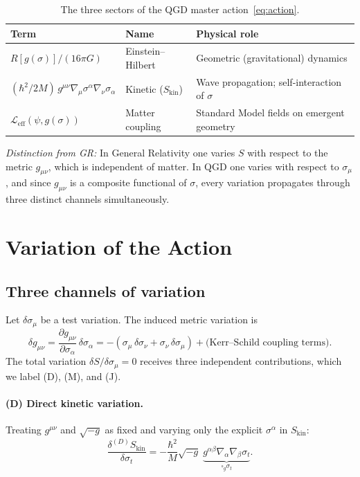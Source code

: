 \documentclass[11pt,a4paper]{article}
\theoremstyle{plain}
\theoremstyle{definition}
\theoremstyle{remark}
\newcommand{\sigt}{\sigma_t}
\newcommand{\boxg}{\square_g}
\newcommand{\Skin}{S_{\mathrm{kin}}}
\begin{document}
\begin{table}[h]
\centering
\renewcommand{\arraystretch}{1.35}
\begin{tabular}{@{}p{4.5cm}p{5cm}p{4.5cm}@{}}
\toprule
Term & Name & Physical role \\
\midrule
$R[g(\sigma)]/(16\pi G)$ & Einstein--Hilbert & Geometric (gravitational) dynamics \\
$(\hbar^2/2M)\,g^{\mu\nu}\nabla_\mu\sigma^\alpha\nabla_\nu\sigma_\alpha$ &
  Kinetic ($\Skin$) & Wave propagation; self-interaction of $\sigma$ \\
$\mathcal{L}_{\mathrm{eff}}(\psi,g(\sigma))$ & Matter coupling &
  Standard Model fields on emergent geometry \\
\bottomrule
\end{tabular}
\caption{The three sectors of the QGD master action~\eqref{eq:action}.}
\end{table}

\textit{Distinction from GR:} In General Relativity one varies $S$ with respect
to the metric $g_{\mu\nu}$, which is independent of matter.  In QGD one varies with
respect to $\sigma_\mu$, and since $g_{\mu\nu}$ is a composite functional of $\sigma$,
every variation propagates through three distinct channels simultaneously.

\section{Variation of the Action}
\label{sec:variation}

\subsection{Three channels of variation}

Let $\delta\sigma_\mu$ be a test variation.  The induced metric variation is
\begin{equation}
  \delta g_{\mu\nu} = \frac{\partial g_{\mu\nu}}{\partial\sigma_\alpha}\,\delta\sigma_\alpha
  = -(\sigma_\mu\,\delta\sigma_\nu + \sigma_\nu\,\delta\sigma_\mu)
    + \text{(Kerr--Schild coupling terms)}.
  \label{eq:delta_g}
\end{equation}
The total variation $\delta S/\delta\sigma_\mu = 0$ receives three independent
contributions, which we label (D), (M), and (J).

\paragraph{(D) Direct kinetic variation.}
Treating $g^{\mu\nu}$ and $\sqrt{-g}$ as fixed and varying only the explicit $\sigma^\alpha$
in $\Skin$:
\begin{equation}
  \frac{\delta^{(D)}\Skin}{\delta\sigt} =
  -\frac{\hbar^2}{M}\sqrt{-g}\;
  \underbrace{g^{\alpha\beta}\nabla_\alpha\nabla_\beta\sigt}_{\displaystyle\boxg\sigt}.
  \label{eq:var_D}
\end{equation}
\end{document}
